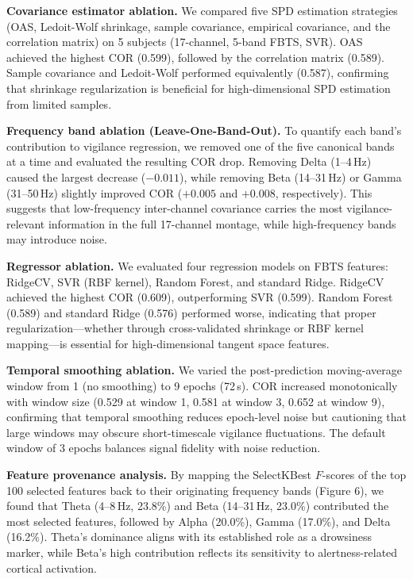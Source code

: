 \documentclass{iopjournal}
\begin{document}
\textbf{Covariance estimator ablation.} We compared five SPD estimation strategies (OAS, Ledoit-Wolf shrinkage, sample covariance, empirical covariance, and the correlation matrix) on 5 subjects (17-channel, 5-band FBTS, SVR). OAS achieved the highest COR (0.599), followed by the correlation matrix (0.589). Sample covariance and Ledoit-Wolf performed equivalently (0.587), confirming that shrinkage regularization is beneficial for high-dimensional SPD estimation from limited samples.

\textbf{Frequency band ablation (Leave-One-Band-Out).} To quantify each band's contribution to vigilance regression, we removed one of the five canonical bands at a time and evaluated the resulting COR drop. Removing Delta (1--4\,Hz) caused the largest decrease ($-0.011$), while removing Beta (14--31\,Hz) or Gamma (31--50\,Hz) slightly improved COR ($+0.005$ and $+0.008$, respectively). This suggests that low-frequency inter-channel covariance carries the most vigilance-relevant information in the full 17-channel montage, while high-frequency bands may introduce noise.

\textbf{Regressor ablation.} We evaluated four regression models on FBTS features: RidgeCV, SVR (RBF kernel), Random Forest, and standard Ridge. RidgeCV achieved the highest COR (0.609), outperforming SVR (0.599). Random Forest (0.589) and standard Ridge (0.576) performed worse, indicating that proper regularization---whether through cross-validated shrinkage or RBF kernel mapping---is essential for high-dimensional tangent space features.

\textbf{Temporal smoothing ablation.} We varied the post-prediction moving-average window from 1 (no smoothing) to 9 epochs (72\,s). COR increased monotonically with window size (0.529 at window 1, 0.581 at window 3, 0.652 at window 9), confirming that temporal smoothing reduces epoch-level noise but cautioning that large windows may obscure short-timescale vigilance fluctuations. The default window of 3 epochs balances signal fidelity with noise reduction.

\textbf{Feature provenance analysis.} By mapping the SelectKBest $F$-scores of the top 100 selected features back to their originating frequency bands (Figure 6), we found that Theta (4--8\,Hz, 23.8\%) and Beta (14--31\,Hz, 23.0\%) contributed the most selected features, followed by Alpha (20.0\%), Gamma (17.0\%), and Delta (16.2\%). Theta's dominance aligns with its established role as a drowsiness marker, while Beta's high contribution reflects its sensitivity to alertness-related cortical activation.
\end{document}
